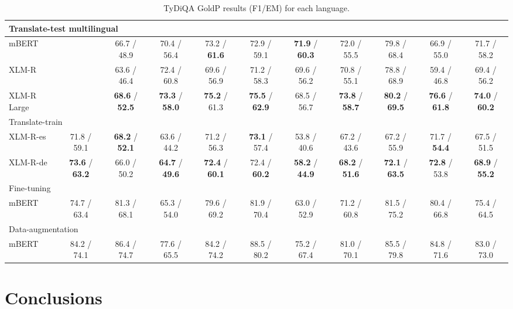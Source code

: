 \documentclass[11pt]{article}
\begin{document}
\begin{table*}[!ht]
\begin{adjustbox}{max width=\textwidth}
\begin{tabular}{l|ccccccccc|c}
        \midrule
        \multicolumn{11}{l}{Translate-test multilingual} \\
        \midrule
        mBERT & ~ & 66.7 / 48.9 & 70.4 / 56.4 & 73.2 / \textbf{61.6} & 72.9 / 59.1 & \textbf{71.9} / \textbf{60.3} & 72.0 / 55.5 & 79.8 / 68.4 & 66.9 / 55.0 & 71.7 / 58.2 \\
        XLM-R & ~ & 63.6 / 46.4 & 72.4 / 60.8 & 69.6 / 56.9 & 71.2 / 58.3 & 69.6 / 56.2 & 70.8 / 55.1 & 78.8 / 68.9 & 59.4 / 46.8 & 69.4 / 56.2 \\
        XLM-R Large & ~ & \textbf{68.6} / \textbf{52.5} & \textbf{73.3} / \textbf{58.0} & \textbf{75.2} / 61.3 & \textbf{75.5} / \textbf{62.9} & 68.5 / 56.7 & \textbf{73.8} / \textbf{58.7} & \textbf{80.2} / \textbf{69.5} & \textbf{76.6} / \textbf{61.8} & \textbf{74.0} / \textbf{60.2}\\
        \midrule
        \multicolumn{11}{l}{Translate-train} \\
        \midrule
        XLM-R-es & 71.8 / 59.1 & \textbf{68.2} / \textbf{52.1} & 63.6 / 44.2 & 71.2 / 56.3 & \textbf{73.1} / 57.4 & 53.8 / 40.6 & 67.2 / 43.6 & 67.2 / 55.9 & 71.7 / \textbf{54.4} & 67.5 / 51.5 \\
        XLM-R-de & \textbf{73.6} / \textbf{63.2} & 66.0 / 50.2 & \textbf{64.7} / \textbf{49.6} & \textbf{72.4} / \textbf{60.1} & 72.4 / \textbf{60.2} & \textbf{58.2} / \textbf{44.9} & \textbf{68.2} / \textbf{51.6} & \textbf{72.1} / \textbf{63.5} & \textbf{72.8} / 53.8 & \textbf{68.9} / \textbf{55.2} \\
        \midrule
        \multicolumn{11}{l}{Fine-tuning} \\
        \midrule
        mBERT & 74.7 / 63.4 & 81.3 / 68.1 & 65.3 / 54.0 & 79.6 / 69.2 & 81.9 / 70.4 & 63.0 / 52.9 & 71.2 / 60.8 & 81.5 / 75.2 & 80.4 / 66.8 & 75.4 / 64.5  \\
        \midrule
        \multicolumn{11}{l}{Data-augmentation} \\
        \midrule
        mBERT & 84.2 / 74.1 & 86.4 / 74.7 & 77.6 / 65.5 & 84.2 / 74.2 & 88.5 / 80.2 & 75.2 / 67.4 & 81.0 / 70.1 & 85.5 / 79.8 & 84.8 / 71.6 & 83.0 / 73.0 \\
        \bottomrule
    \end{tabular}
    \end{adjustbox}
    \centering
    \caption{TyDiQA GoldP results (F1/EM) for each language.}
    \label{TyDiQA_results}
\end{table*}

\section{Conclusions}
\end{document}
